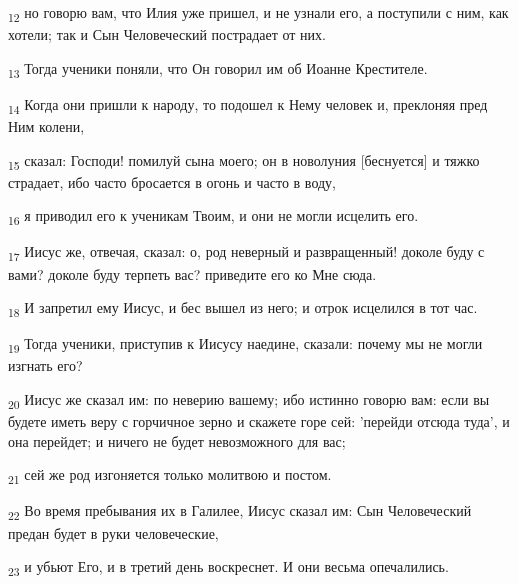 \begin{tcolorbox}
\textsubscript{12} но говорю вам, что Илия уже пришел, и не узнали его, а поступили с ним, как хотели; так и Сын Человеческий пострадает от них.
\end{tcolorbox}
\begin{tcolorbox}
\textsubscript{13} Тогда ученики поняли, что Он говорил им об Иоанне Крестителе.
\end{tcolorbox}
\begin{tcolorbox}
\textsubscript{14} Когда они пришли к народу, то подошел к Нему человек и, преклоняя пред Ним колени,
\end{tcolorbox}
\begin{tcolorbox}
\textsubscript{15} сказал: Господи! помилуй сына моего; он в новолуния [беснуется] и тяжко страдает, ибо часто бросается в огонь и часто в воду,
\end{tcolorbox}
\begin{tcolorbox}
\textsubscript{16} я приводил его к ученикам Твоим, и они не могли исцелить его.
\end{tcolorbox}
\begin{tcolorbox}
\textsubscript{17} Иисус же, отвечая, сказал: о, род неверный и развращенный! доколе буду с вами? доколе буду терпеть вас? приведите его ко Мне сюда.
\end{tcolorbox}
\begin{tcolorbox}
\textsubscript{18} И запретил ему Иисус, и бес вышел из него; и отрок исцелился в тот час.
\end{tcolorbox}
\begin{tcolorbox}
\textsubscript{19} Тогда ученики, приступив к Иисусу наедине, сказали: почему мы не могли изгнать его?
\end{tcolorbox}
\begin{tcolorbox}
\textsubscript{20} Иисус же сказал им: по неверию вашему; ибо истинно говорю вам: если вы будете иметь веру с горчичное зерно и скажете горе сей: 'перейди отсюда туда', и она перейдет; и ничего не будет невозможного для вас;
\end{tcolorbox}
\begin{tcolorbox}
\textsubscript{21} сей же род изгоняется только молитвою и постом.
\end{tcolorbox}
\begin{tcolorbox}
\textsubscript{22} Во время пребывания их в Галилее, Иисус сказал им: Сын Человеческий предан будет в руки человеческие,
\end{tcolorbox}
\begin{tcolorbox}
\textsubscript{23} и убьют Его, и в третий день воскреснет. И они весьма опечалились.
\end{tcolorbox}
